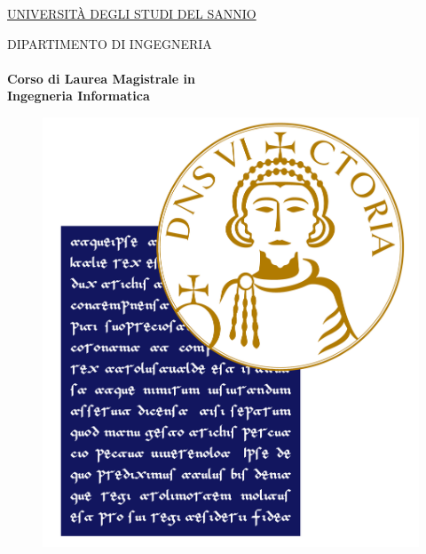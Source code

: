 \linespread{1}

\thispagestyle{empty}
\large

\begin{center}
	\huge{{\underline{\textsc{UNIVERSIT\`A DEGLI STUDI DEL SANNIO}}}}
\end{center}

\begin{center}   
	\huge{{\textsc{DIPARTIMENTO DI INGEGNERIA}}}
	\\
	\LARGE{\textbf{\\Corso di Laurea Magistrale in \\Ingegneria Informatica}}      
	
\end{center}

\begin{figure}[h]
	\begin{center}
		\includegraphics[scale=0.3]{figure/logo/logoUniSannio_new.jpg}
	\end{center}
\end{figure}

